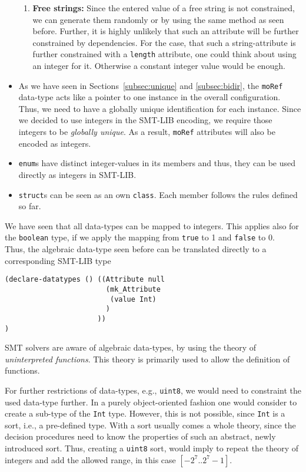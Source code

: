 \begin{itemize}
\begin{enumerate}
  \item \textbf{Free strings:} Since the entered value of a free string is not constrained, we can generate them randomly or by using the same method as seen before. Further, it is highly unlikely that such an attribute will be further constrained by dependencies. For the case, that such a string-attribute is further constrained with a \verb|length| attribute, one could think about using an integer for it. Otherwise a constant integer value would be enough.
\end{enumerate}


 \item As we have seen in Sections~\ref{subsec:unique} and \ref{subsec:bidir}, the \verb|moRef| data-type acts like a pointer to one instance in the overall configuration. Thus, we need to have a globally unique identification for each instance. Since we decided to use integers in the SMT-LIB encoding, we require those integers to be \emph{globally unique}. As a result, \verb|moRef| attributes will also be encoded as integers.

 \item \verb|enum|s have distinct integer-values in its members and thus, they can be used directly as integers in SMT-LIB.\\


 \item \verb|struct|s can be seen as an own \verb|class|. Each member follows the rules defined so far.
\end{itemize}

We have seen that all data-types can be mapped to integers. This applies also for the \verb|boolean| type, if we apply the mapping from \verb|true| to 1 and \verb|false| to 0.\\

Thus, the algebraic data-type seen before can be translated directly to a corresponding SMT-LIB type
\begin{verbatim}
(declare-datatypes () ((Attribute null
                        (mk_Attribute     
                         (value Int)
                        )
                      ))
)
\end{verbatim}
SMT solvers are aware of algebraic data-types, by using the theory of \emph{uninterpreted functions}. This theory is primarily used to allow the definition of functions. 

For further restrictions of data-types, e.g., \verb|uint8|, we would need to constraint the used data-type further. In a purely object-oriented fashion one would consider to create a sub-type of the \verb|Int| type. However, this is not possible, since \verb|Int| is a sort, i.e., a pre-defined type. With a sort usually comes a whole theory, since the decision procedures need to know the properties of such an abstract, newly introduced sort. Thus, creating a \verb|uint8| sort, would imply to repeat the theory of integers and add the allowed range, in this case $[-2^7..2^7 - 1]$. 

